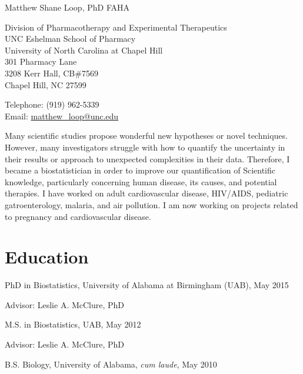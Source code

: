 \documentclass[10pt,letterpaper]{article}
\def\name{Matthew Shane Loop, PhD FAHA}
\renewenvironment{itemize}{
  \begin{list}{}{
    \setlength{\leftmargin}{1.5em}
    \setlength{\itemsep}{0.25em}
    \setlength{\parskip}{0pt}
    \setlength{\parsep}{0.25em}
  }
}{
  \end{list}
}
\begin{document}
{\Huge \name}


\bigskip

\begin{minipage}[t]{0.6\textwidth}
  Division of Pharmacotherapy and Experimental Therapeutics \\
  UNC Eshelman School of Pharmacy\\
  University of North Carolina at Chapel Hill\\
  301 Pharmacy Lane\\
  3208 Kerr Hall, CB\#7569 \\
  Chapel Hill, NC 27599
\end{minipage}
\begin{minipage}[t]{0.5\textwidth}
  Telephone: (919) 962-5339\\
  Email: \href{mailto:matthew\_loop@unc.edu}{matthew\_loop@unc.edu} \\
\end{minipage}

\bigskip

Many scientific studies propose wonderful new hypotheses or novel techniques. However, many investigators struggle with how to quantify the uncertainty in their results or approach to unexpected complexities in their data. Therefore, I became a biostatistician in order to improve our quantification of Scientific knowledge, particularly concerning human disease, its causes, and potential therapies. I have worked on adult cardiovascular disease, HIV/AIDS, pediatric gatroenterology, malaria, and air pollution. I am now working on projects related to pregnancy and cardiovascular disease.

\section*{Education}

\begin{itemize}
	\item PhD in Biostatistics, University of Alabama at Birmingham (UAB), May 2015
		\begin{itemize}
			\item Advisor: Leslie A. McClure, PhD
		\end{itemize}
	\item M.S. in Biostatistics, UAB, May 2012
		\begin{itemize}
			\item Advisor: Leslie A. McClure, PhD
		\end{itemize}
  	\item B.S. Biology, University of Alabama, \textit{cum laude}, May 2010
\end{itemize}
\end{document}
